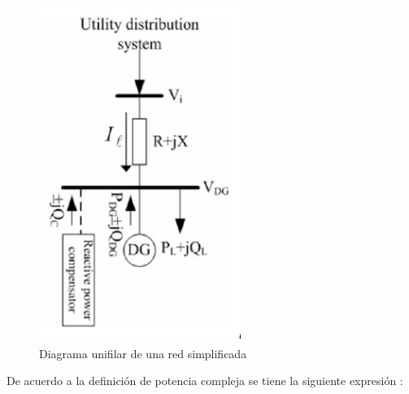 \documentclass[12pt, letterpaper]{report}
\begin{document}
\begin{figure}[h]
    \centering
    \caption{Diagrama unifilar de una red simplificada}
    \label{fig:dos_nodos}
    \includegraphics[width=0.4\linewidth]{imagenes/cap_1/dos_nodos}
\end{figure}
De acuerdo a la definición de potencia compleja se tiene la siguiente expresión \cite{Akagi1932}:
\end{document}
